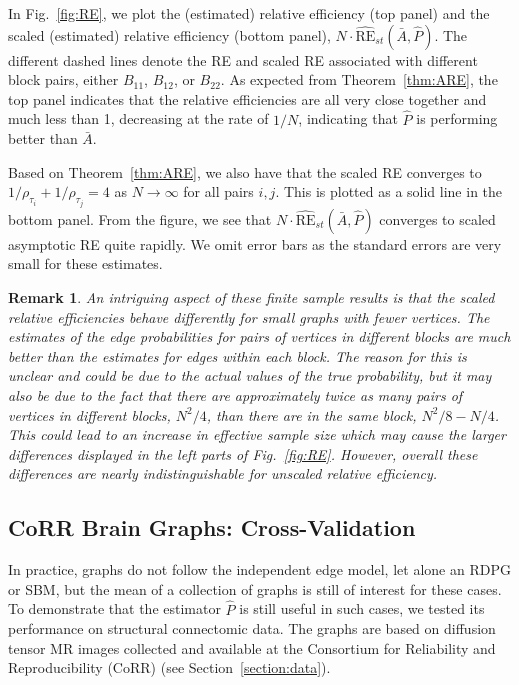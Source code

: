 \documentclass[10pt,letterpaper]{article}
\newtheorem{remark}[fact]{Remark}
\renewcommand{\hat}{\widehat}
\begin{document}
In Fig.~\ref{fig:RE}, we plot the (estimated) relative efficiency (top panel) and the scaled (estimated) relative efficiency (bottom panel), $N \cdot \hat{\mathrm{RE}}_{st}(\bar{A},\hat{P})$.
The different dashed lines denote the RE and scaled RE associated with different block pairs, either $B_{11}$, $B_{12}$, or $B_{22}$. 
As expected from Theorem~\ref{thm:ARE}, the top panel indicates that the relative efficiencies are all very close together and much less than 1, decreasing at the rate of $1/N$, indicating that $\hat{P}$ is performing better than $\bar{A}$.

Based on Theorem~\ref{thm:ARE}, we also have that the scaled RE converges to $1/\rho_{\tau_i}+1/\rho_{\tau_j}=4$ as $N\to\infty$ for all pairs $i,j$.
This is plotted as a solid line in the bottom panel.
From the figure, we see that $N \cdot \hat{\mathrm{RE}}_{st}(\bar{A}, \hat{P})$ converges to scaled asymptotic RE quite rapidly.
We omit error bars as the standard errors are very small for these estimates.

\begin{remark}
An intriguing aspect of these finite sample results is that the scaled relative efficiencies behave differently for small graphs with fewer vertices. 
The estimates of the edge probabilities for pairs of vertices in different blocks are much better than the estimates for edges within each block.
The reason for this is unclear and could be due to the actual values of the true probability, but it may also be due to the fact that there are approximately twice as many pairs of vertices in different blocks, $N^2/4$, than there are in the same block, $N^2/8-N/4$.
This could lead to an increase in effective sample size which may cause the larger differences displayed in the left parts of Fig.~\ref{fig:RE}.
However, overall these differences are nearly indistinguishable for unscaled relative efficiency.
\end{remark}


\subsection{CoRR Brain Graphs: Cross-Validation}\label{sec:corr_data}
In practice, graphs do not follow the independent edge model, let alone an RDPG or SBM, but the mean of a collection of graphs is still of interest for these cases.
To demonstrate that the estimator $\hat{P}$ is still useful in such cases, we tested its performance on structural connectomic data. 
The graphs are based on diffusion tensor MR images collected and available at the Consortium for Reliability and Reproducibility (CoRR) \citep{zuo2014open, gorgolewski2015high} (see Section~\ref{section:data}).
\end{document}
